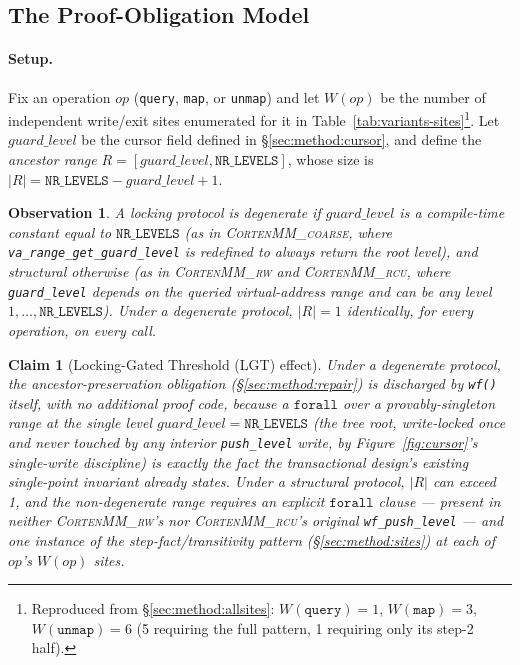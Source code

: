\documentclass[10pt]{article}
\newtheorem{observation}{Observation}
\newtheorem{claim}{Claim}
\newcommand{\corten}[1]{\textsc{CortenMM\_#1}}
\newcommand{\vfn}[1]{\texttt{#1}}
\begin{document}
\subsection{The Proof-Obligation Model}
\label{sec:theory:proof}

\paragraph{Setup.} Fix an operation $\mathit{op}$ (\vfn{query},
\vfn{map}, or \vfn{unmap}) and let $W(\mathit{op})$ be the number of
independent write/exit sites enumerated for it in
Table~\ref{tab:variants-sites}\footnote{Reproduced from
\S\ref{sec:method:allsites}: $W(\vfn{query})=1$, $W(\vfn{map})=3$,
$W(\vfn{unmap})=6$ (5 requiring the full pattern, 1 requiring only its
step-2 half).}. Let $\mathit{guard\_level}$ be the cursor field defined
in \S\ref{sec:method:cursor}, and define the \emph{ancestor range}
$R = [\mathit{guard\_level}, \mathtt{NR\_LEVELS}]$, whose size is
$|R| = \mathtt{NR\_LEVELS} - \mathit{guard\_level} + 1$.

\begin{observation}
\label{obs:degenerate}
A locking protocol is \emph{degenerate} if \(\mathit{guard\_level}\)
is a compile-time constant equal to \(\mathtt{NR\_LEVELS}\) (as in
\corten{coarse}, where \vfn{va\_range\_get\_guard\_level} is redefined
to always return the root level), and \emph{structural} otherwise (as
in \corten{rw} and \corten{rcu}, where \vfn{guard\_level} depends on
the queried virtual-address range and can be any level $1,\ldots,
\mathtt{NR\_LEVELS}$). Under a degenerate protocol, $|R| = 1$
identically, for every operation, on every call.
\end{observation}

\begin{claim}[Locking-Gated Threshold (LGT) effect]
\label{claim:threshold}
Under a degenerate protocol, the ancestor-preservation obligation
(\S\ref{sec:method:repair}) is discharged by \vfn{wf()} itself, with no
additional proof code, because a \(\mathtt{forall}\) over a
provably-singleton range at the single level $\mathit{guard\_level} =
\mathtt{NR\_LEVELS}$ (the tree root, write-locked once and never
touched by any interior \vfn{push\_level} write, by
Figure~\ref{fig:cursor}'s single-write discipline) is exactly the fact
the transactional design's existing single-point invariant already
states. Under a structural protocol, $|R|$ can exceed 1, and the
non-degenerate range requires an explicit \(\mathtt{forall}\) clause
--- present in neither \corten{rw}'s nor \corten{rcu}'s original
\vfn{wf\_push\_level} --- and one instance of the step-fact/transitivity
pattern (\S\ref{sec:method:sites}) at each of $\mathit{op}$'s
$W(\mathit{op})$ sites.
\end{claim}
\end{document}
